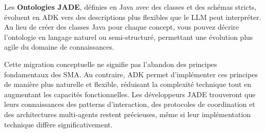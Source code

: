Les \textbf{Ontologies JADE}, définies en Java avec des classes et des schémas stricts, évoluent en ADK vers des descriptions plus flexibles que le LLM peut interpréter. Au lieu de créer des classes Java pour chaque concept, vous pouvez décrire l'ontologie en langage naturel ou semi-structuré, permettant une évolution plus agile du domaine de connaissances.

Cette migration conceptuelle ne signifie pas l'abandon des principes fondamentaux des SMA. Au contraire, ADK permet d'implémenter ces principes de manière plus naturelle et flexible, réduisant la complexité technique tout en augmentant les capacités fonctionnelles. Les développeurs JADE trouveront que leurs connaissances des patterns d'interaction, des protocoles de coordination et des architectures multi-agents restent précieuses, même si leur implémentation technique diffère significativement.